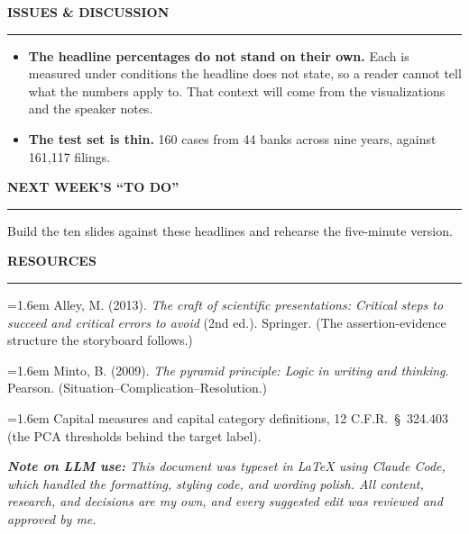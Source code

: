 \documentclass[11pt,letterpaper]{article}
\newcommand{\sectionhead}[1]{%
  \needspace{4\baselineskip}\vspace{4pt}%
  {\sffamily\bfseries\fontsize{9.5}{12}\selectfont\color{navy}\MakeUppercase{#1}}\par
  \vspace{-9pt}\textcolor{hairline}{\rule{\textwidth}{0.5pt}}\par\vspace{0pt}}
\newcommand{\answer}[1]{#1\par\vspace{3pt}}
\begin{document}
\sectionhead{Issues \& discussion}
\answer{\begin{itemize}[topsep=1pt,itemsep=4pt,leftmargin=14pt,label=\textcolor{navy}{\footnotesize\textbullet}]
  \item \textbf{The headline percentages do not stand on their own.} Each is measured under conditions the headline does not state, so a reader cannot tell what the numbers apply to. That context will come from the visualizations and the speaker notes.
  \item \textbf{The test set is thin.} 160 cases from 44 banks across nine years, against 161,117 filings.
\end{itemize}}

\sectionhead{Next week's ``To Do''}
\answer{Build the ten slides against these headlines and rehearse the five-minute version.}

\sectionhead{Resources}
\answer{{\fontsize{8.8}{10.8}\selectfont\setlength{\parskip}{2pt}\par\vspace{3pt}
\newcommand{\refentry}[1]{\hangindent=1.6em\hangafter=1 #1\par}
\refentry{Alley, M. (2013). \textit{The craft of scientific presentations: Critical steps to succeed and critical errors to avoid} (2nd ed.). Springer. (The assertion-evidence structure the storyboard follows.)}
\refentry{Minto, B. (2009). \textit{The pyramid principle: Logic in writing and thinking}. Pearson. (Situation--Complication--Resolution.)}
\refentry{Capital measures and capital category definitions, 12 C.F.R.\ \S\ 324.403 (the PCA thresholds behind the target label).}
}}

\vspace{2pt}
{\small\itshape\color{midgray}\textbf{Note on LLM use:} This document was typeset in LaTeX using Claude Code, which handled the formatting, styling code, and wording polish. All content, research, and decisions are my own, and every suggested edit was reviewed and approved by me.}
\end{document}
